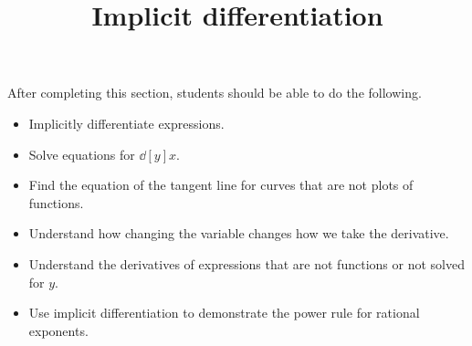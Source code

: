 \documentclass{ximera}
\title{Implicit differentiation}
\begin{document}
\begin{abstract}
\end{abstract}

\maketitle

\begin{sectionOutcomes}

After completing this section, students should be able to do the following.

\begin{itemize}
	\item Implicitly differentiate expressions.
	\item Solve equations for $\dd[y]{x}$.
	\item Find the equation of the tangent line for curves that
          are not plots of functions.
	\item Understand how changing the variable changes how we take
          the derivative.
	\item Understand the derivatives of expressions that are not
          functions or not solved for $y$.
	\item Use implicit differentiation to demonstrate the power
          rule for rational exponents.
\end{itemize}

\end{sectionOutcomes}
\end{document}
